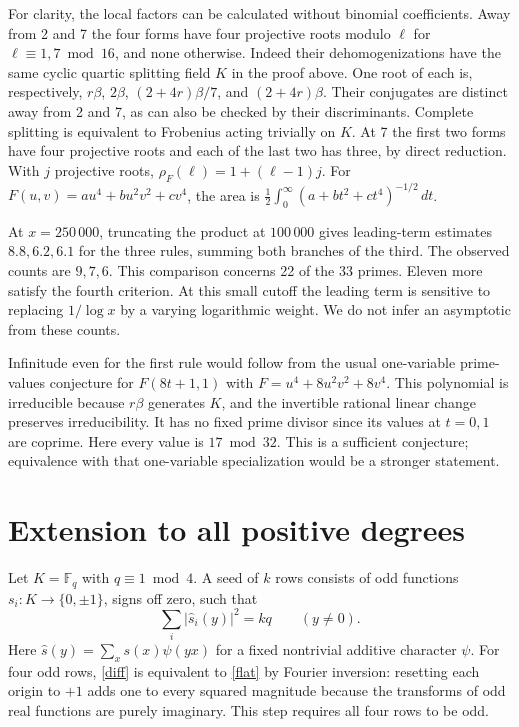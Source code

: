 \documentclass[11pt]{article}
\newcommand{\F}{\mathbb F}
\begin{document}
For clarity, the local factors can be calculated without binomial coefficients. Away from 2 and 7 the four forms have four projective roots modulo $\ell$ for $\ell\equiv1,7\bmod16$, and none otherwise. Indeed their dehomogenizations have the same cyclic quartic splitting field $K$ in the proof above. One root of each is, respectively, $r\beta$, $2\beta$, $(2+4r)\beta/7$, and $(2+4r)\beta$. Their conjugates are distinct away from 2 and 7, as can also be checked by their discriminants. Complete splitting is equivalent to Frobenius acting trivially on $K$. At 7 the first two forms have four projective roots and each of the last two has three, by direct reduction. With $j$ projective roots, $\rho_F(\ell)=1+(\ell-1)j$. For $F(u,v)=au^4+bu^2v^2+cv^4$, the area is $\frac12\int_0^\infty(a+bt^2+ct^4)^{-1/2}\,dt$.

At $x=250\,000$, truncating the product at $100\,000$ gives leading-term estimates $8.8,6.2,6.1$ for the three rules, summing both branches of the third. The observed counts are $9,7,6$. This comparison concerns 22 of the 33 primes. Eleven more satisfy the fourth criterion. At this small cutoff the leading term is sensitive to replacing $1/\log x$ by a varying logarithmic weight. We do not infer an asymptotic from these counts.

Infinitude even for the first rule would follow from the usual one-variable prime-values conjecture for $F(8t+1,1)$ with $F=u^4+8u^2v^2+8v^4$. This polynomial is irreducible because $r\beta$ generates $K$, and the invertible rational linear change preserves irreducibility. It has no fixed prime divisor since its values at $t=0,1$ are coprime. Here every value is $17\bmod32$. This is a sufficient conjecture; equivalence with that one-variable specialization would be a stronger statement.

\section{Extension to all positive degrees}\label{extension}
Let $K=\F_q$ with $q\equiv1\bmod4$. A seed of $k$ rows consists of odd functions $s_i:K\to\{0,\pm1\}$, signs off zero, such that
\begin{equation}\label{flat}
 \sum_i|\widehat s_i(y)|^2=kq \qquad(y\ne0).
\end{equation}
Here $\widehat s(y)=\sum_x s(x)\psi(yx)$ for a fixed nontrivial additive character $\psi$. For four odd rows, \eqref{diff} is equivalent to \eqref{flat} by Fourier inversion: resetting each origin to $+1$ adds one to every squared magnitude because the transforms of odd real functions are purely imaginary. This step requires all four rows to be odd.
\end{document}
